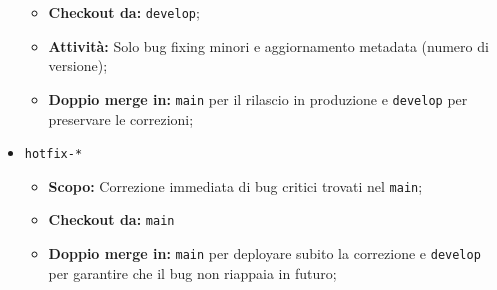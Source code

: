 \documentclass[12pt]{article}
\begin{document}
\begin{itemize}
\begin{itemize}
          \item \textbf{Checkout da:} \texttt{develop};
          \item \textbf{Attività:} Solo bug fixing minori e aggiornamento metadata (numero di versione);
          \item \textbf{Doppio merge in:} \texttt{main} per il rilascio in produzione e \texttt{develop} per preservare le correzioni;
        \end{itemize}
      \item \texttt{hotfix-*}
        \begin{itemize}
          \item \textbf{Scopo:} Correzione immediata di bug critici trovati nel \texttt{main};
          \item \textbf{Checkout da:} \texttt{main}
          \item \textbf{Doppio merge in:} \texttt{main} per deployare subito la correzione e \texttt{develop} per garantire che il bug non riappaia in futuro;
        \end{itemize}
    \end{itemize}
\end{document}
